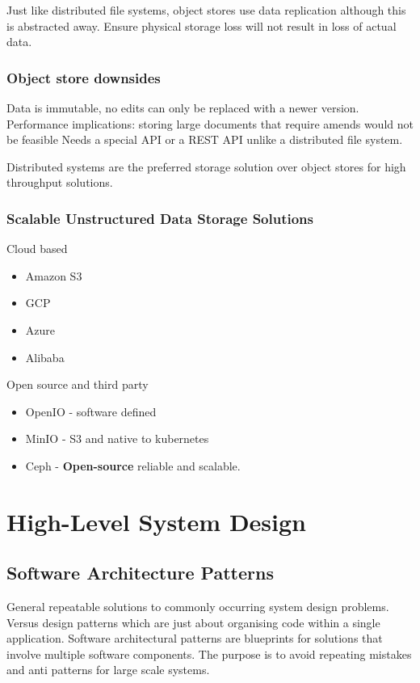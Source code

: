 \documentclass[a4paper, 11pt]{book}
\begin{document}
    Just like distributed file systems, object stores use data replication although this is abstracted away.
    Ensure physical storage loss will not result in loss of actual data.

    \subsection{Object store downsides}
    Data is immutable, no edits can only be replaced with a newer version.
    Performance implications: storing large documents that require amends would not be feasible
    Needs a special API or a REST API unlike a distributed file system.

    Distributed systems are the preferred storage solution over object stores for high throughput solutions.

    \subsection{Scalable Unstructured Data Storage Solutions}
    Cloud based
    \begin{itemize}%
        \item Amazon S3
        \item GCP
        \item Azure
        \item Alibaba
    \end{itemize}

    Open source and third party
    \begin{itemize}
        \item OpenIO - software defined
        \item MinIO - S3 and native to kubernetes
        \item Ceph - \textbf{Open-source} reliable and scalable.
    \end{itemize}


    \chapter{High-Level System Design}

    \section{Software Architecture Patterns}
    General repeatable solutions to commonly occurring system design problems.
    Versus design patterns which are just about organising code within a single application.
    Software architectural patterns are blueprints for solutions that involve multiple software components.
    The purpose is to avoid repeating mistakes and anti patterns for large scale systems.
\end{document}

